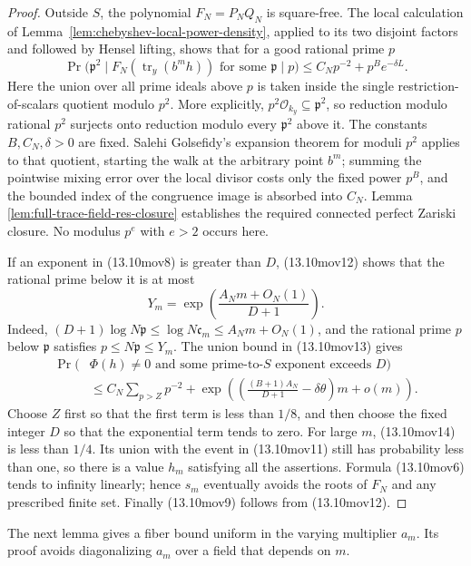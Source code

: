 \documentclass[11pt,reqno]{amsart}
\theoremstyle{definition}
\theoremstyle{remark}
\newcommand{\cO}{\mathcal O}
\newcommand{\Tr}{\operatorname{tr}}
\begin{document}
\begin{proof}
Outside \(S\), the polynomial \(F_N=P_NQ_N\) is square-free.  The local
calculation of Lemma~\ref{lem:chebyshev-local-power-density}, applied to
its two disjoint factors and followed by Hensel lifting, shows that for a
good rational prime \(p\)
\[
 \Pr\bigl(\mathfrak p^2\mid
 F_N(\Tr_y(b^mh))\text{ for some }\mathfrak p\mid p\bigr)
 \le C_Np^{-2}+p^B e^{-\delta L}.
\tag{13.10mov13}
\]
Here the union over all prime ideals above \(p\) is taken inside the single
restriction-of-scalars quotient modulo \(p^2\).  More explicitly,
\(p^2\cO_{k_y}\subseteq\mathfrak p^2\), so reduction modulo rational
\(p^2\) surjects onto reduction modulo every \(\mathfrak p^2\) above it.
The constants
\(B,C_N,\delta>0\) are fixed.  Salehi Golsefidy's expansion theorem for
moduli \(p^2\) applies to that quotient, starting the walk at the arbitrary point
\(b^m\); summing the pointwise mixing error over the local divisor costs
only the fixed power \(p^B\), and the bounded index of the congruence image
is absorbed into \(C_N\).  Lemma
\ref{lem:full-trace-field-res-closure} establishes the required connected
perfect Zariski closure.  No modulus \(p^e\) with \(e>2\) occurs here.

If an exponent in (13.10mov8) is greater than \(D\), (13.10mov12) shows
that the rational prime below it is at most
\[
 Y_m=\exp\left(\frac{A_Nm+O_N(1)}{D+1}\right).
\]
Indeed,
\((D+1)\log N\mathfrak p\le\log N\mathfrak c_m
\le A_Nm+O_N(1)\), and the rational prime \(p\) below
\(\mathfrak p\) satisfies \(p\le N\mathfrak p\le Y_m\).
The union bound in (13.10mov13) gives
\[
 \begin{split}
 \Pr(&\Phi(h)\ne0\text{ and some prime-to-}S\text{ exponent exceeds }D)\\
 &\le C_N\sum_{p>Z}p^{-2}
 +\exp\left(
   \left(\frac{(B+1)A_N}{D+1}-\delta\theta\right)m+o(m)
          \right).
 \end{split}
\tag{13.10mov14}
\]
Choose \(Z\) first so that the first term is less than \(1/8\), and then
choose the fixed integer \(D\) so that the exponential term tends to zero.
For large \(m\), (13.10mov14) is less than \(1/4\).  Its union with the
event in (13.10mov11) still has probability less than one, so there is a
value \(h_m\) satisfying all the assertions.  Formula (13.10mov6) tends
to infinity linearly; hence \(s_m\) eventually avoids the roots of \(F_N\)
and any prescribed finite set.  Finally (13.10mov9) follows from
(13.10mov12).
\end{proof}

The next lemma gives a fiber bound uniform in the varying multiplier
\(a_m\).  Its proof avoids diagonalizing \(a_m\) over a field that depends
on \(m\).
\end{document}
